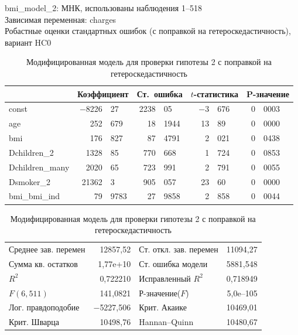 \documentclass[a4paper,12pt]{article}
\begin{document}
\begin{table}[H]
\begin{center}
	bmi\_model\_2:
	МНК, использованы наблюдения 1--518\\
	Зависимая переменная: charges\\
	Робастные оценки стандартных ошибок (с поправкой на гетероскедастичность),\\ вариант HC0\\
	\vspace{1em}
	\begin{tabular}{|l|r@{,}l|r@{,}l|r@{,}l|r@{,}l|}
		\hline
		&
		\multicolumn{2}{c|}{Коэффициент} &
		\multicolumn{2}{c|}{Ст.\ ошибка} &
		\multicolumn{2}{c|}{$t$-статистика} &
		\multicolumn{2}{c|}{P-значение} \\[1ex] \hline
		const &	$-$8226&27 & 2238&05 & $-$3&676 & 0&0003 \\ \hline
		age & 252&679 &	18&1944 & 13&89 & 0&0000 \\ \hline
		bmi & 176&827 &	87&4791 & 2&021 & 0&0438 \\ \hline
		Dchildren\_2 & 1328&85 & 770&668 & 1&724 & 0&0853 \\ \hline
		Dchildren\_many & 2020&65 &	723&991 & 2&791 & 0&0055 \\ \hline
		Dsmoker\_2 & 21362&3 & 905&057 & 23&60 & 0&0000 \\ \hline
		bmi\_bmi\_ind & 79&9783 & 27&9858 &	2&858 &	0&0044 \\ \hline
	\end{tabular}
	\vspace{1ex}
	\begin{tabular}{lrlr}
		Среднее зав. перемен &  12857,52 & Ст. откл. зав. перемен &  11094,27 \\
		Сумма кв. остатков &  1,77\textrm{e+10} & Ст. ошибка модели &  5881,548 \\
		$R^2$ &  0,722210 & Исправленный $R^2$ &  0,718949 \\
		$F(6, 511)$ &  141,0821 & Р-значение($F$) &  5,0\textrm{e--105} \\
		Лог. правдоподобие & $-$5227,506 & Крит. Акаике &  10469,01 \\
		Крит. Шварца &  10498,76 & Hannan--Quinn &  10480,67 \\
	\end{tabular}
\caption{Модифицированная модель для проверки гипотезы 2 с поправкой на гетероскедастичность}
\end{center}
\end{table}
\end{document}
